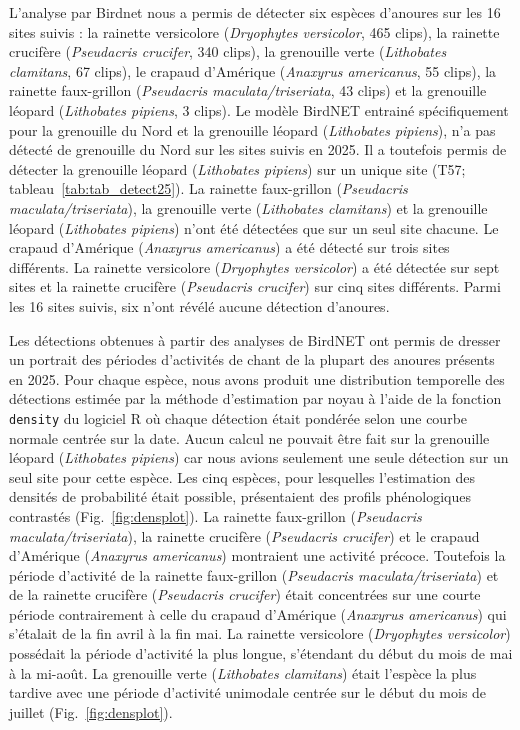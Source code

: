 L'analyse par Birdnet nous a permis de détecter six espèces d'anoures sur les 16 sites suivis : la rainette versicolore (\emph{Dryophytes versicolor}, 465 clips), la rainette crucifère (\emph{Pseudacris crucifer}, 340 clips), la grenouille verte (\emph{Lithobates clamitans}, 67 clips), le crapaud d'Amérique (\emph{Anaxyrus americanus}, 55 clips), la rainette faux-grillon (\emph{Pseudacris maculata/triseriata}, 43 clips) et la grenouille léopard (\emph{Lithobates pipiens}, 3 clips). Le modèle BirdNET entrainé spécifiquement pour la grenouille du Nord et la grenouille léopard (\emph{Lithobates pipiens}), n'a pas détecté de grenouille du Nord sur les sites suivis en 2025. Il a toutefois permis de détecter la grenouille léopard (\emph{Lithobates pipiens}) sur un unique site (T57; tableau~\ref{tab:tab_detect25}). La rainette faux-grillon (\emph{Pseudacris maculata/triseriata}), la grenouille verte (\emph{Lithobates clamitans}) et la grenouille léopard (\emph{Lithobates pipiens}) n'ont été détectées que sur un seul site chacune. Le crapaud d'Amérique (\emph{Anaxyrus americanus}) a été détecté sur trois sites différents. La rainette versicolore (\emph{Dryophytes versicolor}) a été détectée sur sept sites et la rainette crucifère (\emph{Pseudacris crucifer}) sur cinq sites différents. Parmi les 16 sites suivis, six n'ont révélé aucune détection d'anoures. 

Les détections obtenues à partir des analyses de BirdNET ont permis de dresser un portrait des périodes d'activités de chant de la plupart des anoures présents en 2025. Pour chaque espèce, nous avons produit une distribution temporelle des détections estimée par la méthode d'estimation par noyau à l'aide de la fonction \texttt{density} du logiciel R \citep{R} où chaque détection était pondérée selon une courbe normale centrée sur la date. Aucun calcul ne pouvait être fait sur la grenouille léopard (\emph{Lithobates pipiens}) car nous avions seulement une seule détection sur un seul site pour cette espèce. Les cinq espèces, pour lesquelles l'estimation des densités de probabilité était possible,  présentaient des profils phénologiques contrastés (Fig.~\ref{fig:densplot}). La rainette faux-grillon (\emph{Pseudacris maculata/triseriata}), la rainette crucifère (\emph{Pseudacris crucifer}) et le crapaud d'Amérique (\emph{Anaxyrus americanus}) montraient une activité précoce. Toutefois la période d'activité de la rainette faux-grillon (\emph{Pseudacris maculata/triseriata}) et de la rainette crucifère (\emph{Pseudacris crucifer}) était concentrées sur une courte période contrairement à celle du crapaud d'Amérique (\emph{Anaxyrus americanus}) qui s'étalait de la fin avril à la fin mai. La rainette versicolore (\emph{Dryophytes versicolor}) possédait la période d'activité la plus longue, s'étendant du début du mois de mai à la mi-août. La grenouille verte (\emph{Lithobates clamitans}) était l'espèce la plus tardive avec une période d'activité unimodale centrée sur le début du mois de juillet (Fig.~\ref{fig:densplot}).


